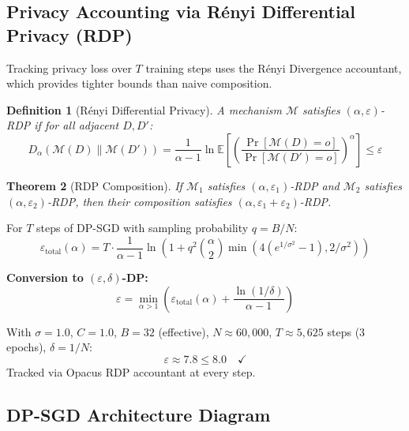\documentclass[11pt, a4paper]{article}
\newtheorem{theorem}{Theorem}[section]
\newtheorem{definition}[theorem]{Definition}
\newcommand{\eps}{\varepsilon}
\newcommand{\E}{\mathbb{E}}
\begin{document}
\subsection{Privacy Accounting via R\'{e}nyi Differential Privacy (RDP)}

Tracking privacy loss over $T$ training steps uses the R\'{e}nyi Divergence accountant, which provides tighter bounds than naive composition.

\begin{definition}[R\'{e}nyi Differential Privacy]
A mechanism $\mathcal{M}$ satisfies $(\alpha, \eps)$-RDP if for all adjacent $D, D'$:
\begin{equation}
D_\alpha(\mathcal{M}(D) \| \mathcal{M}(D')) = \frac{1}{\alpha - 1} \ln \E\left[\left(\frac{\Pr[\mathcal{M}(D) = o]}{\Pr[\mathcal{M}(D') = o]}\right)^\alpha\right] \leq \eps
\end{equation}
\end{definition}

\begin{theorem}[RDP Composition]
If $\mathcal{M}_1$ satisfies $(\alpha, \eps_1)$-RDP and $\mathcal{M}_2$ satisfies $(\alpha, \eps_2)$-RDP, then their composition satisfies $(\alpha, \eps_1 + \eps_2)$-RDP.
\end{theorem}

For $T$ steps of DP-SGD with sampling probability $q = B/N$:
\begin{equation}
\eps_{\text{total}}(\alpha) = T \cdot \frac{1}{\alpha - 1}\ln\left(1 + q^2 \binom{\alpha}{2}\min(4(e^{1/\sigma^2} - 1), 2/\sigma^2)\right)
\end{equation}

\textbf{Conversion to $(\eps, \delta)$-DP:}
\begin{equation}
\eps = \min_{\alpha > 1} \left(\eps_{\text{total}}(\alpha) + \frac{\ln(1/\delta)}{\alpha - 1}\right)
\end{equation}

\begin{notebox}
With $\sigma = 1.0$, $C = 1.0$, $B = 32$ (effective), $N \approx 60{,}000$, $T \approx 5{,}625$ steps ($3$ epochs), $\delta = 1/N$:
\[
\eps \approx 7.8 \leq 8.0 \quad \checkmark
\]
Tracked via Opacus RDP accountant at every step.
\end{notebox}

\subsection{DP-SGD Architecture Diagram}
\end{document}
